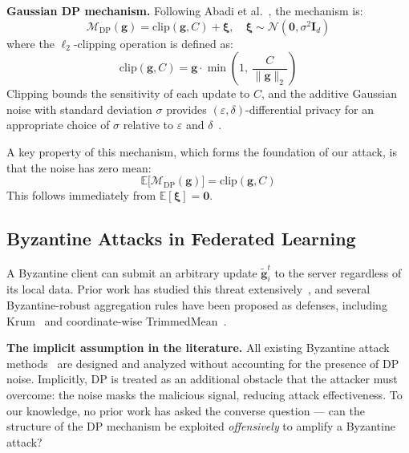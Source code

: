 \documentclass[conference]{IEEEtran}
\begin{document}
\textbf{Gaussian DP mechanism.} Following
Abadi et al.~\cite{abadi2016deep}, the mechanism is:
\begin{equation}
    \mathcal{M}_{\mathrm{DP}}(\mathbf{g})
    = \mathrm{clip}(\mathbf{g}, C) + \boldsymbol{\xi},
    \quad
    \boldsymbol{\xi} \sim \mathcal{N}(\mathbf{0},
    \sigma^2 \mathbf{I}_d)
    \label{eq:dp-mechanism}
\end{equation}
where the $\ell_2$-clipping operation is defined as:
\begin{equation}
    \mathrm{clip}(\mathbf{g}, C)
    = \mathbf{g} \cdot
    \min\!\left(1,\, \frac{C}{\|\mathbf{g}\|_2}\right)
    \label{eq:clipping}
\end{equation}
Clipping bounds the sensitivity of each update to $C$,
and the additive Gaussian noise with standard deviation
$\sigma$ provides $(\varepsilon, \delta)$-differential
privacy for an appropriate choice of $\sigma$ relative
to $\varepsilon$ and $\delta$~\cite{abadi2016deep}.

A key property of this mechanism, which forms the
foundation of our attack, is that the noise has zero mean:
\begin{equation}
    \mathbb{E}\bigl[\mathcal{M}_{\mathrm{DP}}(\mathbf{g})
    \bigr]
    = \mathrm{clip}(\mathbf{g}, C)
    \label{eq:zero-mean}
\end{equation}
This follows immediately from $\mathbb{E}[\boldsymbol{\xi}]
= \mathbf{0}$.

\subsection{Byzantine Attacks in Federated Learning}

A Byzantine client can submit an arbitrary update
$\tilde{\mathbf{g}}_i^t$ to the server regardless of
its local data. Prior work has studied this threat
extensively~\cite{blanchard2017machine,yin2018byzantine,
baruch2019little,shejwalkar2021manipulating}, and several
Byzantine-robust aggregation rules have been proposed
as defenses, including Krum~\cite{blanchard2017machine}
and coordinate-wise TrimmedMean~\cite{yin2018byzantine}.

\textbf{The implicit assumption in the literature.}
All existing Byzantine attack
methods~\cite{baruch2019little,shejwalkar2021manipulating}
are designed and analyzed without accounting for the
presence of DP noise. Implicitly, DP is treated as an
additional obstacle that the attacker must overcome:
the noise masks the malicious signal, reducing attack
effectiveness. To our knowledge, no prior work has
asked the converse question --- can the structure of the
DP mechanism be exploited \emph{offensively} to amplify
a Byzantine attack?
\end{document}
